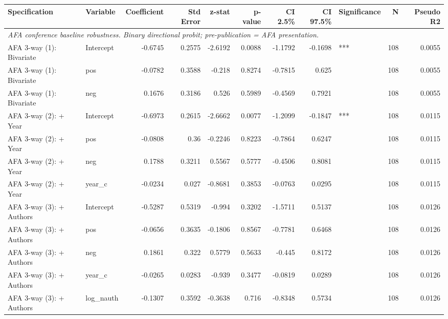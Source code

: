\begin{tabular}{llrrrrrrlrr}
\toprule
Specification & Variable & Coefficient & Std Error & z-stat & p-value & CI 2.5\% & CI 97.5\% & Significance & N & Pseudo R2 \\
\midrule
\multicolumn{11}{l}{\textit{AFA conference baseline robustness. Binary directional probit; pre-publication = AFA presentation.}} \\[2pt]
AFA 3-way (1): Bivariate & Intercept & -0.6745 & 0.2575 & -2.6192 & 0.0088 & -1.1792 & -0.1698 & *** & 108 & 0.0055 \\
AFA 3-way (1): Bivariate & pos & -0.0782 & 0.3588 & -0.218 & 0.8274 & -0.7815 & 0.625 &  & 108 & 0.0055 \\
AFA 3-way (1): Bivariate & neg & 0.1676 & 0.3186 & 0.526 & 0.5989 & -0.4569 & 0.7921 &  & 108 & 0.0055 \\
AFA 3-way (2): + Year & Intercept & -0.6973 & 0.2615 & -2.6662 & 0.0077 & -1.2099 & -0.1847 & *** & 108 & 0.0115 \\
AFA 3-way (2): + Year & pos & -0.0808 & 0.36 & -0.2246 & 0.8223 & -0.7864 & 0.6247 &  & 108 & 0.0115 \\
AFA 3-way (2): + Year & neg & 0.1788 & 0.3211 & 0.5567 & 0.5777 & -0.4506 & 0.8081 &  & 108 & 0.0115 \\
AFA 3-way (2): + Year & year_c & -0.0234 & 0.027 & -0.8681 & 0.3853 & -0.0763 & 0.0295 &  & 108 & 0.0115 \\
AFA 3-way (3): + Authors & Intercept & -0.5287 & 0.5319 & -0.994 & 0.3202 & -1.5711 & 0.5137 &  & 108 & 0.0126 \\
AFA 3-way (3): + Authors & pos & -0.0656 & 0.3635 & -0.1806 & 0.8567 & -0.7781 & 0.6468 &  & 108 & 0.0126 \\
AFA 3-way (3): + Authors & neg & 0.1861 & 0.322 & 0.5779 & 0.5633 & -0.445 & 0.8172 &  & 108 & 0.0126 \\
AFA 3-way (3): + Authors & year_c & -0.0265 & 0.0283 & -0.939 & 0.3477 & -0.0819 & 0.0289 &  & 108 & 0.0126 \\
AFA 3-way (3): + Authors & log_nauth & -0.1307 & 0.3592 & -0.3638 & 0.716 & -0.8348 & 0.5734 &  & 108 & 0.0126 \\
\bottomrule
\end{tabular}
